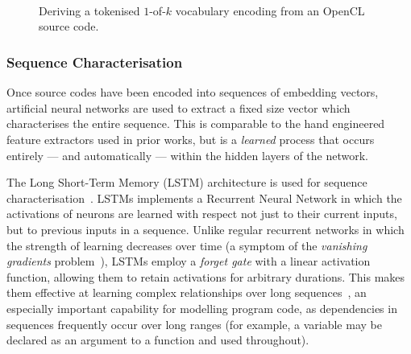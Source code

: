 \begin{figure}
  \centering %
  \\%
  \\%
  \\%
  \caption[Deriving a vocabulary encoding from an OpenCL source code]{%
    Deriving a tokenised $1$-of-$k$ vocabulary encoding from an OpenCL source
    code.%
  }%
  \label{fig:encoding}%
\end{figure}


\subsubsection{Sequence Characterisation}

Once source codes have been encoded into sequences of embedding vectors, artificial neural networks are used to extract a fixed size vector which characterises the entire sequence. This is comparable to the hand engineered feature extractors used in prior works, but is a \emph{learned} process that occurs entirely --- and automatically --- within the hidden layers of the network.

The Long Short-Term Memory (LSTM) architecture is used for sequence characterisation~\cite{Hochreiter1997}. LSTMs implements a Recurrent Neural Network in which the activations of neurons are learned with respect not just to their current inputs, but to previous inputs in a sequence. Unlike regular recurrent networks in which the strength of learning decreases over time (a symptom of the \emph{vanishing gradients} problem~\cite{Pacanu2013}), LSTMs employ a \emph{forget gate} with a linear activation function, allowing them to retain activations for arbitrary durations. This makes them effective at learning complex relationships over long sequences~\cite{Lipton2015}, an especially important capability for modelling program code, as dependencies in sequences frequently occur over long ranges (for example, a variable may be declared as an argument to a function and used throughout).

